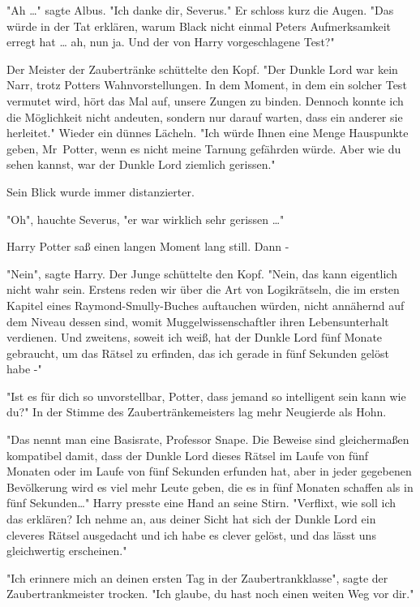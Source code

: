 {"Ah …" sagte Albus. "Ich danke dir, Severus." Er schloss kurz die Augen. "Das würde in der Tat erklären, warum Black nicht einmal Peters Aufmerksamkeit erregt hat … ah, nun ja. Und der von Harry vorgeschlagene Test?"

Der Meister der Zaubertränke schüttelte den Kopf. "Der Dunkle Lord war kein Narr, trotz Potters Wahnvorstellungen. In dem Moment, in dem ein solcher Test vermutet wird, hört das Mal auf, unsere Zungen zu binden. Dennoch konnte ich die Möglichkeit nicht andeuten, sondern nur darauf warten, dass ein anderer sie herleitet." Wieder ein dünnes Lächeln. "Ich würde Ihnen eine Menge Hauspunkte geben, Mr~Potter, wenn es nicht meine Tarnung gefährden würde. Aber wie du sehen kannst, war der Dunkle Lord ziemlich gerissen."

Sein Blick wurde immer distanzierter.

"Oh", hauchte Severus, "er war wirklich sehr gerissen …"

Harry Potter saß einen langen Moment lang still. Dann -

"Nein", sagte Harry. Der Junge schüttelte den Kopf. "Nein, das kann eigentlich nicht wahr sein. Erstens reden wir über die Art von Logikrätseln, die im ersten Kapitel eines Raymond-Smully-Buches auftauchen würden, nicht annähernd auf dem Niveau dessen sind, womit Muggelwissenschaftler ihren Lebensunterhalt verdienen. Und zweitens, soweit ich weiß, hat der Dunkle Lord fünf Monate gebraucht, um das Rätsel zu erfinden, das ich gerade in fünf Sekunden gelöst habe -"

"Ist es für dich so unvorstellbar, Potter, dass jemand so intelligent sein kann wie du?" In der Stimme des Zaubertränkemeisters lag mehr Neugierde als Hohn.

"Das nennt man eine Basisrate, Professor Snape. Die Beweise sind gleichermaßen kompatibel damit, dass der Dunkle Lord dieses Rätsel im Laufe von fünf Monaten oder im Laufe von fünf Sekunden erfunden hat, aber in jeder gegebenen Bevölkerung wird es viel mehr Leute geben, die es in fünf Monaten schaffen als in fünf Sekunden…" Harry presste eine Hand an seine Stirn. "Verflixt, wie soll ich das erklären? Ich nehme an, aus deiner Sicht hat sich der Dunkle Lord ein cleveres Rätsel ausgedacht und ich habe es clever gelöst, und das lässt uns gleichwertig erscheinen."

"Ich erinnere mich an deinen ersten Tag in der Zaubertrankklasse", sagte der Zaubertrankmeister trocken. "Ich glaube, du hast noch einen weiten Weg vor dir."

}
